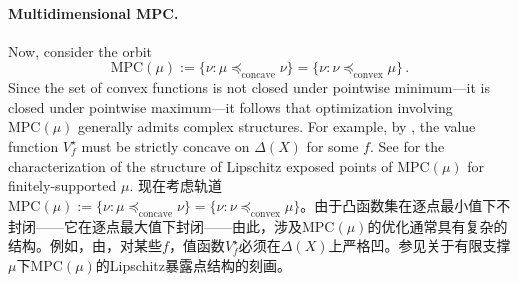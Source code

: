 \documentclass[12pt,letterpaper]{article}
\newenvironment{original}{\color{black}}{}
\newenvironment{translation}{\color{blue}}{}
\theoremstyle{plain}
\theoremstyle{definition}
\theoremstyle{remark}
\theoremstyle{definition}
\begin{document}
\paragraph{Multidimensional MPC.}\hspace{-2mm}
\begin{original}
Now, consider the orbit
\[\text{MPC}(\mu) := \big\{\nu: \mu \preceq_{\text{concave}} \nu\big\} = \big\{\nu: \nu \preceq_{\text{convex}} \mu \big\}\,.\]
Since the set of convex functions is not closed under pointwise minimum---it is closed under pointwise maximum---it follows that optimization involving $\text{MPC}(\mu)$ generally admits complex structures. For example, by , the value function $V^\star_f$ must be strictly concave on $\Delta(X)$ for some $f$. See \citet{kleiner2024extreme} for the characterization of the structure of Lipschitz exposed points of $\text{MPC}(\mu)$ for finitely-supported $\mu$.
\end{original}
\begin{translation}
现在考虑轨道$\text{MPC}(\mu) := \{\nu: \mu \preceq_{\text{concave}} \nu\} = \{\nu: \nu \preceq_{\text{convex}} \mu\}$。由于凸函数集在逐点最小值下不封闭——它在逐点最大值下封闭——由此，涉及$\text{MPC}(\mu)$的优化通常具有复杂的结构。例如，由，对某些$f$，值函数$V^\star_f$必须在$\Delta(X)$上严格凹。参见\citet{kleiner2024extreme}关于有限支撑$\mu$下$\text{MPC}(\mu)$的Lipschitz暴露点结构的刻画。
\end{translation}
\end{document}
